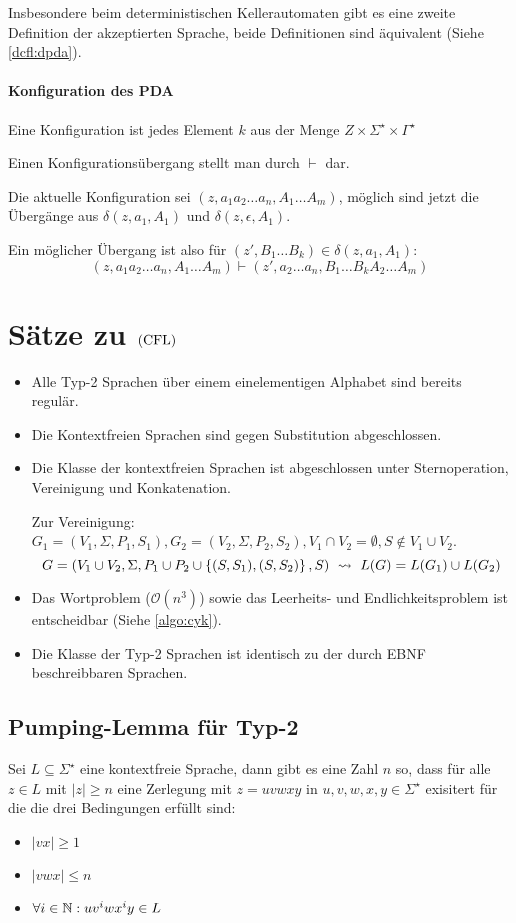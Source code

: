 Insbesondere beim deterministischen Kellerautomaten gibt es eine zweite Definition der akzeptierten Sprache, beide Definitionen sind äquivalent (Siehe \autoref{dcfl:dpda}).

\paragraph{Konfiguration des PDA}
Eine Konfiguration ist jedes Element $k$ aus der Menge $Z\times\Sigma^\star\times\Gamma^\star$

Einen Konfigurationsübergang stellt man durch $\vdash$ dar.

Die aktuelle Konfiguration sei $(z,a_1a_2\ldots a_n,A_1\ldots A_m)$, möglich sind jetzt die Übergänge aus $\delta(z,a_1,A_1)$ und $\delta(z,\epsilon,A_1)$.

Ein möglicher Übergang ist also für $(z',B_1\ldots B_k)\in\delta(z,a_1,A_1)$:
\begin{equation*}
	(z,a_1a_2\ldots a_n,A_1\ldots A_m)\vdash (z',a_2\ldots a_n,B_1\ldots B_kA_2\ldots A_m)
\end{equation*}



\section{Sätze zu $\mathrm{(CFL)}$}
\begin{itemize}
	\item Alle Typ-2 Sprachen über einem einelementigen Alphabet sind bereits regulär.
	\item Die Kontextfreien Sprachen sind gegen Substitution abgeschlossen.
	\item Die Klasse der kontextfreien Sprachen ist abgeschlossen unter Sternoperation, Vereinigung und Konkatenation.

	Zur Vereinigung: $G_1=(V_1,\Sigma, P_1,S_1), G_2=(V_2,\Sigma, P_2,S_2), V_1\cap V_2=\emptyset, S\not\in V_1\cup V_2$.
	\begin{equation*}
		G=(V_1\cup V_2, \Sigma, P_1\cup P_2\cup\simpleset{(S,S_1),(S,S_2)},S) \ \rightsquigarrow\  L(G)=L(G_1)\cup L(G_2)
	\end{equation*}
	\item Das Wortproblem ($\mathcal O(n^3)$) sowie das Leerheits- und Endlichkeitsproblem ist entscheidbar (Siehe \autoref{algo:cyk}).
	\item Die Klasse der Typ-2 Sprachen ist identisch zu der durch EBNF beschreibbaren Sprachen.
\end{itemize}
\subsection{Pumping-Lemma für Typ-2}
Sei $L\subseteq \Sigma^\star$ eine kontextfreie Sprache, dann gibt es eine Zahl $n$ so, dass für alle $z\in L$ mit $|z|\geq n$ eine Zerlegung mit $z=uvwxy$ in $u,v,w,x,y\in\Sigma^\star$ exisitert für die die drei Bedingungen erfüllt sind:
\begin{itemize}
	\item $|vx|\geq 1$
	\item $|vwx|\leq n$
	\item $\forall i\in\mathbb{N}: uv^iwx^iy\in L$
\end{itemize}

